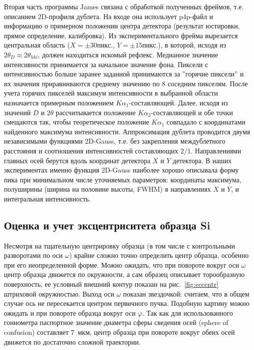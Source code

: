 Вторая часть программы James связана с обработкой полученных фреймов, т.е. описанием 2D-профиля дублета. На входе она использует p4p-файл и информацию о примерном положении центра детектора (результат юстировки, прямое определение, калибровка).
Из экспериментального фрейма вырезается центральная область ($X = \pm 30\unit{пикс.}$, $Y = \pm 15\unit{пикс.}$), в которой, исходя из $2\theta_D \approx 2\theta_{hkl}$, должен находиться искомый рефлекс.
Медианное значение интенсивности принимается за начальное значение фона.
Пиксели с интенсивностью больше заранее заданной принимаются за ''горячие пиксели'' и их значения приравниваются среднему значению по 8 соседним пикселям.
После учета горячих пикселей максимум интенсивности в выбранной области назначается примерным положением $K\alpha_1$-составляющей.
Далее, исходя из значений $D$ и $2\theta$ рассчитывается положение $K\alpha_2$-составляющей и обе точки смещаются так, чтобы теоретическое положение $K\alpha_1$ совпадало с координатами найденного максимума интенсивности.
Аппроксимация дублета проводится двумя независимыми  функциями 2D-Gauss, т.е. без закрепления междублетного расстояния и соотношения интенсивностей составляющих $2/1$.
Направлениями главных осей берутся вдоль координат детектора $X$ и $Y$ детектора.
В наших экспериментах именно функция 2D-Gauss наиболее хорошо описывала форму пика при минимальном числе уточняемых параметров: координаты максимума, полуширины (ширина на половине высоты, FWHM) в направлениях $X$ и $Y$, и интегральная интенсивность.

\subsection{Оценка и учет эксцентриситета образца Si}

Несмотря на тщательную центрировку образца (в том числе с контрольными разворотами по оси $\omega$) крайне сложно точно определить центр образца, особенно при его неопределенной форме.
Можно ожидать, что при повороте вокруг оси $\omega$ центр образца движется по окружности, а сам образец описывает торообразную поверхность, ее условный внешний контур показан на рис.~\ref{fig:eccentr} штриховой окружностью.
Выход оси $\omega$ показан звездочкой: считаем, что в общем случае ось не пересекается центром первичного пучка.
Подобную картину можно ожидать и при повороте образца вокруг оси $\varphi$.
Так как для использованного гониометра паспортное значение диаметра сферы сведения осей (sphere of confusion) составляет 7~мкм, центр образца при повороте вокруг обеих осей движется по достаточно сложной траектории.

